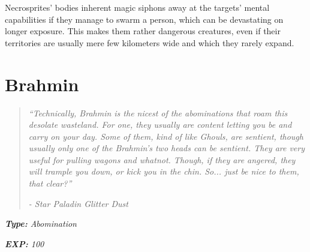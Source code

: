 \documentclass[11pt,a4paper,twocolumn]{book}
\begin{document}
	Necrosprites' bodies inherent magic siphons away at the targets' mental capabilities if they manage to swarm a person, which can be devastating on longer exposure. This makes them rather dangerous creatures, even if their territories are usually mere few kilometers wide and which they rarely expand.
	
	\clearpage
	
	\section*{Brahmin}
	\begin{quote}
		\emph{``Technically, Brahmin is the nicest of the abominations that roam this desolate wasteland. For one, they usually are content letting you be and carry on your day. Some of them, kind of like Ghouls, are sentient, though usually only one of the Brahmin's two heads can be sentient. They are very useful for pulling wagons and whatnot. Though, if they are angered, they will trample you down, or kick you in the chin. So... just be nice to them, that clear?''}
		
		\emph{-	Star Paladin Glitter Dust}
	\end{quote}
	
	\noindent
	\emph{\textbf{Type:} Abomination}
	
	\noindent
	\emph{\textbf{EXP:} 100}
	
%		
%	
%		
\end{document}
